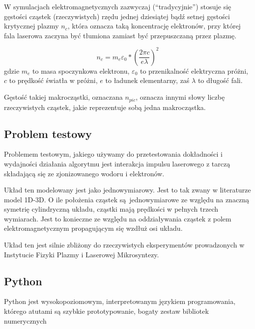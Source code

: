     W symulacjach elektromagnetycznych zazwyczaj (``tradycyjnie'') stosuje się
    gęstości cząstek (rzeczywistych) rzędu jednej dziesiątej bądź setnej
    gęstości krytycznej plazmy $n_c$, która oznacza taką koncentrację
    elektronów, przy której fala laserowa zaczyna być tłumiona zamiast być
    przepuszczaną przez plazmę.  

    \begin{equation}
        n_c = m_e \varepsilon_0 * {(\frac{2 \pi c}{e \lambda})}^2
        \label{eqn:critical-density}
    \end{equation}
    gdzie $m_e$ to masa spoczynkowa elektronu, $\varepsilon_0$ to przenikalność
    elektryczna próżni,  $c$ to prędkość światła w
    próżni, $e$ to ładunek elementarny, zaś $\lambda$ to długość fali.

    Gęstość takiej makrocząstki, oznaczana $n_{pic}$, oznacza innymi słowy
    liczbę rzeczywistych cząstek, jakie reprezentuje sobą jedna makrocząstka.

    \subsection{Problem testowy}

    Problemem testowym, jakiego używamy do przetestowania dokładności i
    wydajności działania algorytmu jest interakcja impulsu laserowego z tarczą
    składającą się ze zjonizowanego wodoru i elektronów.

    Układ ten modelowany jest jako jednowymiarowy. Jest to tak zwany w
    literaturze model 1D-3D.  O ile położenia cząstek są jednowymiarowe ze
    względu na znaczną symetrię cylindryczną układu, cząstki mają prędkości w
    pełnych trzech wymiarach. Jest to konieczne ze względu na oddziaływania
    cząstek z polem elektromagnetycznym propagującym się wzdłuż osi układu.

    Układ ten jest silnie zbliżony do rzeczywistych eksperymentów prowadzonych
    w Instytucie Fizyki Plazmy i Laserowej Mikrosyntezy.  

    \subsection{Python}
    Python jest wysokopoziomowym, interpretowanym językiem programowania,
    którego atutami są szybkie prototypowanie, bogaty zestaw bibliotek
    numerycznych

